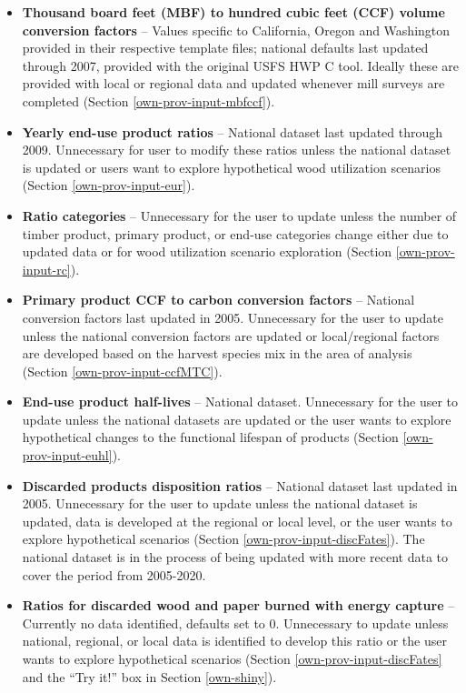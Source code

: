 \documentclass[
  openany]{book}
\begin{document}
\begin{itemize}
\item
  \textbf{Thousand board feet (MBF) to hundred cubic feet (CCF) volume conversion factors} -- Values specific to California, Oregon and Washington provided in their respective template files; national defaults last updated through 2007, provided with the original USFS HWP C tool. Ideally these are provided with local or regional data and updated whenever mill surveys are completed (Section \ref{own-prov-input-mbfccf}).
\item
  \textbf{Yearly end-use product ratios} -- National dataset last updated through 2009. Unnecessary for user to modify these ratios unless the national dataset is updated or users want to explore hypothetical wood utilization scenarios (Section \ref{own-prov-input-eur}).
\item
  \textbf{Ratio categories} -- Unnecessary for the user to update unless the number of timber product, primary product, or end-use categories change either due to updated data or for wood utilization scenario exploration (Section \ref{own-prov-input-rc}).
\item
  \textbf{Primary product CCF to carbon conversion factors} -- National conversion factors last updated in 2005. Unnecessary for the user to update unless the national conversion factors are updated or local/regional factors are developed based on the harvest species mix in the area of analysis (Section \ref{own-prov-input-ccfMTC}).
\item
  \textbf{End-use product half-lives} -- National dataset. Unnecessary for the user to update unless the national datasets are updated or the user wants to explore hypothetical changes to the functional lifespan of products (Section \ref{own-prov-input-euhl}).
\item
  \textbf{Discarded products disposition ratios} -- National dataset last updated in 2005. Unnecessary for the user to update unless the national dataset is updated, data is developed at the regional or local level, or the user wants to explore hypothetical scenarios (Section \ref{own-prov-input-discFates}). The national dataset is in the process of being updated with more recent data \autocite{usepa2020} to cover the period from 2005-2020.
\item
  \textbf{Ratios for discarded wood and paper burned with energy capture} -- Currently no data identified, defaults set to 0. Unnecessary to update unless national, regional, or local data is identified to develop this ratio or the user wants to explore hypothetical scenarios (Section \ref{own-prov-input-discFates} and the ``Try it!'' box in Section \ref{own-shiny}).

\end{itemize}
\end{document}
